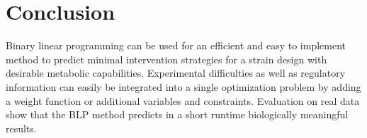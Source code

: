 \documentclass{llncs}
\begin{document}
\section{Conclusion}
Binary linear programming can be used for an efficient and easy to implement
method to predict minimal intervention strategies for a strain design
with desirable metabolic capabilities. 
Experimental difficulties as well as regulatory information can easily be
integrated into a single optimization problem by adding a weight function or 
additional variables and constraints.
Evaluation on real data show that the BLP method predicts in a short runtime
biologically meaningful results.

\end{document}
